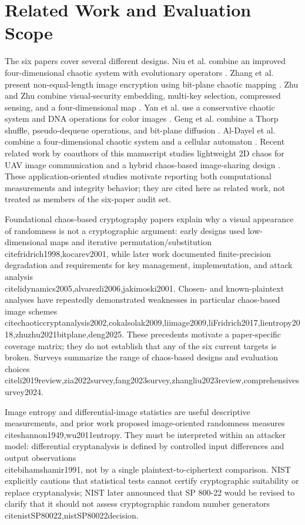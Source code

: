 \documentclass[letterpaper,journal]{IEEEtran}
\begin{document}
\section{Related Work and Evaluation Scope}
The six papers cover several different designs. Niu et al. combine an improved four-dimensional chaotic system with evolutionary operators \cite{niu2024}. Zhang et al. present non-equal-length image encryption using bit-plane chaotic mapping \cite{zhang2024}. Zhu and Zhu combine visual-security embedding, multi-key selection, compressed sensing, and a four-dimensional map \cite{zhu2024}. Yan et al. use a conservative chaotic system and DNA operations for color images \cite{yan2025}. Geng et al. combine a Thorp shuffle, pseudo-dequeue operations, and bit-plane diffusion \cite{geng2025}. Al-Dayel et al. combine a four-dimensional chaotic system and a cellular automaton \cite{aldayel2025}. Recent related work by coauthors of this manuscript studies lightweight 2D chaos for UAV image communication and a hybrid chaos-based image-sharing design \cite{bhargav2025lightweight,molika2026sharing}. These application-oriented studies motivate reporting both computational measurements and integrity behavior; they are cited here as related work, not treated as members of the six-paper audit set.

Foundational chaos-based cryptography papers explain why a visual appearance of randomness is not a cryptographic argument: early designs used low-dimensional maps and iterative permutation/substitution \\cite{fridrich1998,kocarev2001}, while later work documented finite-precision degradation and requirements for key management, implementation, and attack analysis \\cite{lidynamics2005,alvarezli2006,jakimoski2001}. Chosen- and known-plaintext analyses have repeatedly demonstrated weaknesses in particular chaos-based image schemes \\cite{chaoticcryptanalysis2002,cokalsolak2009,liimage2009,liFridrich2017,lientropy2018,zhuzhu2021bitplane,deng2025}. These precedents motivate a paper-specific coverage matrix; they do not establish that any of the six current targets is broken. Surveys summarize the range of chaos-based designs and evaluation choices \\cite{li2019review,zia2022survey,fang2023survey,zhangliu2023review,comprehensivesurvey2024}.

Image entropy and differential-image statistics are useful descriptive measurements, and prior work proposed image-oriented randomness measures \\cite{shannon1949,wu2011entropy}. They must be interpreted within an attacker model: differential cryptanalysis is defined by controlled input differences and output observations \\cite{bihamshamir1991}, not by a single plaintext-to-ciphertext comparison. NIST explicitly cautions that statistical tests cannot certify cryptographic suitability or replace cryptanalysis; NIST later announced that SP 800-22 would be revised to clarify that it should not assess cryptographic random number generators \\cite{nistSP80022,nistSP80022decision}.
\end{document}
